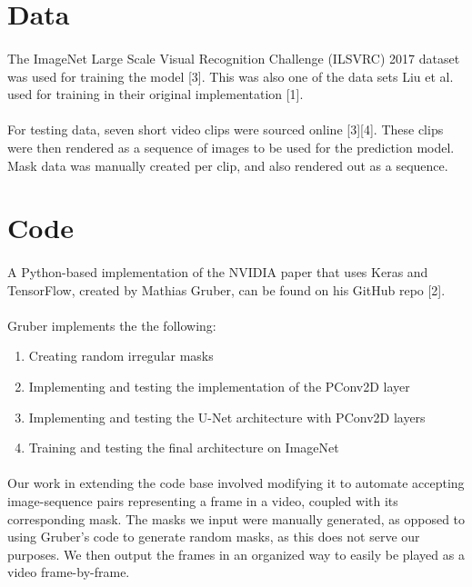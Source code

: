 \documentclass{article}
\begin{document}
\pagebreak
\section{Data}

\paragraph{}
The ImageNet Large Scale Visual Recognition Challenge (ILSVRC) 2017 dataset was used for training the model [3]. This was also one of the data sets Liu et al. used for training in their original implementation [1].

\paragraph{}
For testing data, seven short video clips were sourced online [3][4]. These clips were then rendered as a sequence of images to be used for the prediction model. Mask data was manually created per clip, and also rendered out as a sequence. 


\section{Code}
\paragraph{}
A Python-based implementation of the NVIDIA paper that uses Keras and TensorFlow, created by Mathias Gruber, can be found on his GitHub repo [2].

\paragraph{}
Gruber implements the the following:

\begin{enumerate}
    \item Creating random irregular masks
    \item Implementing and testing the implementation of the PConv2D layer
    \item Implementing and testing the U-Net architecture with PConv2D layers
    \item Training and testing the final architecture on ImageNet
\end{enumerate}

\paragraph{}
Our work in extending the code base involved modifying it to automate accepting image-sequence pairs representing a frame in a video, coupled with its corresponding mask. The masks we input were manually generated, as opposed to using Gruber's code to generate random masks, as this does not serve our purposes. We then output the frames in an organized way to easily be played as a video frame-by-frame.
\end{document}
